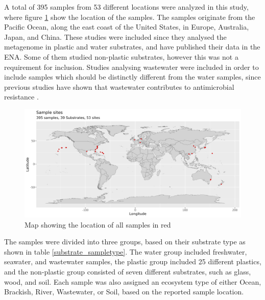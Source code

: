 A total of 395 samples from 53 different locations were analyzed in this study, where figure \ref{world_map} show the location of the samples. 
The samples originate from the Pacific Ocean, along the east coast of the United States, in Europe, Australia, Japan, and China.
These studies were included since they analysed the metagenome in plastic and water substrates, and have published their data in the ENA. Some of them studied non-plastic substrates, however this was not a requirement for inclusion. Studies analysing wastewater were included in order to include samples which should be distinctly different from the water samples, since previous studies have shown that wastewater contributes to antimicrobial resistance \cite{sambaza2023ContributionWastewaterAntimicrobial}.


\begin{figure}[h]
    \centering
    \includegraphics[width = \textwidth]{figure/map.png}
    \caption{Map showing the location of all samples in red}
    \label{world_map}
\end{figure}

The samples were divided into three groups, based on their substrate type as shown in table \ref{substrate_sampletype}. 
The water group included freshwater, seawater, and wastewater samples, the plastic group included 25 different plastics, and the non-plastic group consisted of seven different substrates, such as glass, wood, and soil. 
Each sample was also assigned an ecosystem type of either Ocean, Brackish, River, Wastewater, or Soil, based on the reported sample location.

